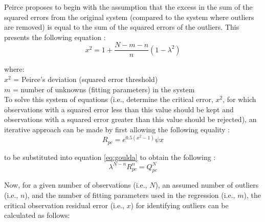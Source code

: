 Peirce proposes to begin with the assumption that the excess in the sum of the squared errors from the original system (compared to the system where outliers are removed) is equal to the sum of the squared errors of the outliers.  
This presents the following equation \parencite[Eq. C]{gould55}:
\begin{equation}
\label{eq:gouldc}
    x^{2} = 1 + \frac{N-m-n}{n}(1 - \lambda^{2})
\end{equation}

\noindent where: \\
\indent $x^{2}$ = Peirce's deviation (squared error threshold) \\
\indent $m$ = number of unknowns (fitting parameters) in the system \\

To solve this system of equations (i.e., determine the critical error, $x^{2}$, for which observations with a squared error less than this value should be kept and observations with a squared error greater than this value should be rejected), an iterative approach can be made by first allowing the following equality \parencite[Eq. D]{gould55}:
\begin{equation}
\label{eq:gouldd}
    R_{pc} = e^{0.5(x^2-1)}\psi x
\end{equation}

\noindent to be substituted into equation \ref{eq:goulda} to obtain the following \parencite[Eq. A$'$]{gould55}:
\begin{equation}
\label{eq:gouldap}
    \lambda^{N-n} R_{pc}^{n} = Q_{pc}^{N}
\end{equation}

\noindent Now, for a given number of observations (i.e., $N$), an assumed number of outliers (i.e., $n$), and the number of fitting parameters used in the regression (i.e., $m$), the critical observation residual error (i.e., $x$) for identifying outliers can be calculated as follows:

